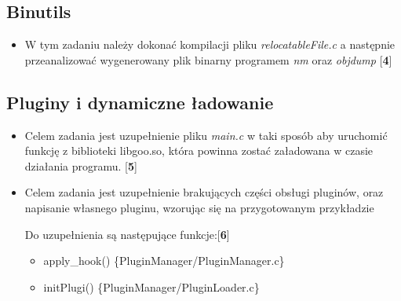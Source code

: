 \documentclass[12pt]{article}
\begin{document}
\subsection{Binutils}
\begin{itemize}
\item W tym zadaniu należy dokonać kompilacji pliku \textit{relocatableFile.c} a
  następnie przeanalizować wygenerowany plik binarny programem \textit{nm} oraz
  \textit{objdump} [\textbf{4}]
\end{itemize}

\subsection{Pluginy i dynamiczne ładowanie}
\begin{itemize}
\item Celem zadania jest uzupełnienie pliku \textit{main.c} w taki sposób aby
  uruchomić funkcję z biblioteki libgoo.so, która powinna zostać załadowana w
  czasie działania programu. [\textbf{5}]

\item Celem zadania jest uzupełnienie brakujących części obsługi pluginów, oraz
  napisanie własnego pluginu, wzorując się na przygotowanym przykładzie

  Do uzupełnienia są następujące funkcje:[\textbf{6}]

  \begin{itemize}
  \item apply\_hook() \{PluginManager/PluginManager.c\}
  \item initPlugi() \{PluginManager/PluginLoader.c\}
  \end{itemize}
\end{itemize}
\end{document}
